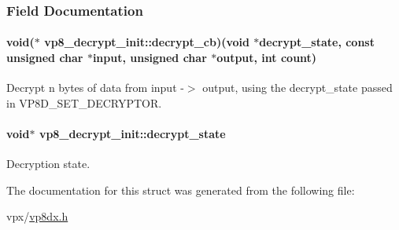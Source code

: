 \subsubsection{Field Documentation}
\hypertarget{structvp8__decrypt__init_ae8eaa106b6567813006a0afb5a46a36c}{
\paragraph[{decrypt\+\_\+cb}]{\setlength{\rightskip}{0pt plus 5cm}void($\ast$ vp8\+\_\+decrypt\+\_\+init\+::decrypt\+\_\+cb)(void $\ast${\bf decrypt\+\_\+state}, const unsigned char $\ast$input, unsigned char $\ast$output, int count)}}\label{structvp8__decrypt__init_ae8eaa106b6567813006a0afb5a46a36c}
Decrypt n bytes of data from input -\/$>$ output, using the decrypt\+\_\+state passed in V\+P8\+D\+\_\+\+S\+E\+T\+\_\+\+D\+E\+C\+R\+Y\+P\+T\+O\+R. \hypertarget{structvp8__decrypt__init_a1bb41a1fbd95eaccc79a322dc4c6685d}{
\paragraph[{decrypt\+\_\+state}]{\setlength{\rightskip}{0pt plus 5cm}void$\ast$ vp8\+\_\+decrypt\+\_\+init\+::decrypt\+\_\+state}}\label{structvp8__decrypt__init_a1bb41a1fbd95eaccc79a322dc4c6685d}
Decryption state. 

The documentation for this struct was generated from the following file\+:\begin{DoxyCompactItemize}
\item 
vpx/\hyperlink{vp8dx_8h}{vp8dx.\+h}\end{DoxyCompactItemize}

